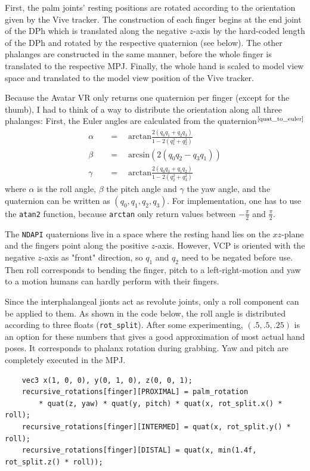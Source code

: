 \documentclass[hyperref, bachelorofscience]{cgvpub}
\newcommand{\newcite}[1]{$ ^{\text{\cite{#1}}} $}
\begin{document}
First, the palm joints' resting positions are rotated according to the orientation given by the Vive tracker. The construction of each finger begins at the end joint of the \gls{DPh} which is translated along the negative $ z $-axis by the hard-coded length of the \gls{DPh} and rotated by the respective quaternion (see below). The other phalanges are constructed in the same manner, before the whole finger is translated to the respective \gls{MPJ}. Finally, the whole hand is scaled to model view space and translated to the model view position of the Vive tracker.

Because the Avatar VR only returns one quaternion per finger (except for the thumb), I had to think of a way to distribute the orientation along all three phalanges: First, the Euler angles are calculated from the quaternion\newcite{quat_to_euler}
\begin{align*}
	\alpha \quad&=\quad \mbox{arctan} \frac {2(q_0 q_1 + q_2 q_3)} {1 - 2(q_1^2 + q_2^2)} \\
	\beta \quad&=\quad \mbox{arcsin} (2(q_0 q_2 - q_3 q_1)) \\
	\gamma \quad&=\quad \mbox{arctan} \frac {2(q_0 q_3 + q_1 q_2)} {1 - 2(q_2^2 + q_3^2)}
\end{align*}
where $ \alpha $ is the roll angle, $ \beta $ the pitch angle and $ \gamma $ the yaw angle, and the quaternion can be written as $ (q_{0}, q_{1}, q_{2}, q_{3}) $. For implementation, one has to use the \lstinline|atan2| function, because \lstinline|arctan| only return values between $ -\frac{\pi}{2} $ and $ \frac{\pi}{2} $.

The \lstinline|NDAPI| quaternions live in a space where the resting hand lies on the $ xz $-plane and the fingers point along the positive $ z $-axis. However, \gls{VCP} is oriented with the negative $ z $-axis as "front" direction, so $ q_{1} $ and $ q_{2} $ need to be negated before use. Then roll corresponds to bending the finger, pitch to a left-right-motion and yaw to a motion humans can hardly perform with their fingers.

Since the interphalangeal jionts act as revolute joints, only a roll component can be applied to them. As shown in the code below, the roll angle is distributed according to three floats (\lstinline|rot_split|). After some experimenting, $ (.5, .5, .25) $ is an option for these numbers that gives a good approximation of most actual hand poses. It corresponds to phalanx rotation during grabbing. Yaw and pitch are completely executed in the \gls{MPJ}. 
\begin{lstlisting}
	vec3 x(1, 0, 0), y(0, 1, 0), z(0, 0, 1);
	recursive_rotations[finger][PROXIMAL] = palm_rotation
		* quat(z, yaw) * quat(y, pitch) * quat(x, rot_split.x() * roll);
	recursive_rotations[finger][INTERMED] = quat(x, rot_split.y() * roll);
	recursive_rotations[finger][DISTAL] = quat(x, min(1.4f, rot_split.z() * roll));
\end{lstlisting}
\end{document}

